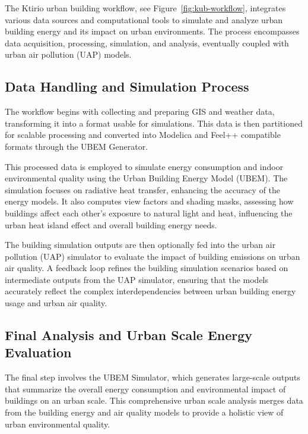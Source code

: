 \documentclass[runningheads]{llncs}
\begin{document}
The Ktirio urban building workflow, see Figure~\ref{fig:kub-workflow}, integrates various data sources and computational tools to simulate and analyze urban building energy and its impact on urban environments. The process encompasses data acquisition, processing, simulation, and analysis, eventually coupled with urban air pollution (UAP) models.

\subsection{Data Handling and Simulation Process}
\label{sec:data-handling}

The workflow begins with collecting and preparing GIS and weather data, transforming it into a format usable for simulations. This data is then partitioned for scalable processing and converted into Modelica and Feel++\cite{christophe_prudhomme_feelppfeelpp_2024} compatible formats through the UBEM Generator.

This processed data is employed to simulate energy consumption and indoor environmental quality using the Urban Building Energy Model (UBEM). The simulation focuses on radiative heat transfer, enhancing the accuracy of the energy models. It also computes view factors and shading masks, assessing how buildings affect each other's exposure to natural light and heat, influencing the urban heat island effect and overall building energy needs.

The building simulation outputs are then optionally fed into the urban air pollution (UAP) simulator to evaluate the impact of building emissions on urban air quality. A feedback loop refines the building simulation scenarios based on intermediate outputs from the UAP simulator, ensuring that the models accurately reflect the complex interdependencies between urban building energy usage and urban air quality.

\subsection{Final Analysis and Urban Scale Energy Evaluation}
\label{sec:final-analysis}

The final step involves the UBEM Simulator, which generates large-scale outputs that summarize the overall energy consumption and environmental impact of buildings on an urban scale. This comprehensive urban scale analysis merges data from the building energy and air quality models to provide a holistic view of urban environmental quality.
\end{document}
